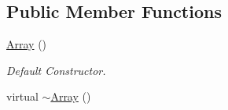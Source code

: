 \subsection*{Public Member Functions}
\begin{DoxyCompactItemize}
\item 
\hyperlink{classDE_1_1Array_ada53b6c458d578ac3199a06ea3f258fb}{Array} ()\hypertarget{classDE_1_1Array_ada53b6c458d578ac3199a06ea3f258fb}{}\label{classDE_1_1Array_ada53b6c458d578ac3199a06ea3f258fb}

\begin{DoxyCompactList}\small\item\em Default Constructor. \end{DoxyCompactList}\item 
virtual \hyperlink{classDE_1_1Array_a3bcebef65959a0685e257308f50c58f2}{$\sim$\+Array} ()\hypertarget{classDE_1_1Array_a3bcebef65959a0685e257308f50c58f2}{}\label{classDE_1_1Array_a3bcebef65959a0685e257308f50c58f2}


\end{DoxyCompactItemize}
